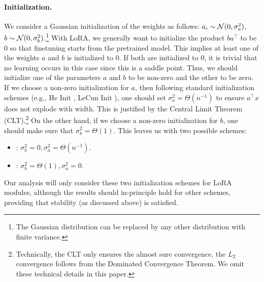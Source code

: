 \paragraph{Initialization.} We consider a Gaussian initialization of the weights as follows: $a_i \sim \mathcal{N}(0,\sigma_a^2)$, $b \sim \mathcal{N}(0, \sigma_b^2)$.\footnote{The Gaussian distribution can be replaced by any other distribution with finite variance.} With LoRA, we generally want to initialize the product $ba^\top$ to be $0$ so that finetuning starts from the pretrained model. This implies at least one of the weights $a$ and $b$ is initialized to $0$. If both are initialized to $0$, it is trivial that no learning occurs in this case since this is a saddle point. Thus, we should initialize one of the parameters $a$ and $b$ to be non-zero and the other to be zero. If we choose a non-zero initialization for $a$, then following standard initialization schemes (e.g., He Init \citep{he2016deep}, LeCun Init \citep{lecun2002efficient}), one should set $\sigma_a^2 = \Theta(n^{-1})$ to ensure $a^\top x$ does not explode with width. This is justified by the Central Limit Theorem (CLT).\footnote{Technically, the CLT only ensures the almost sure convergence, the $L_2$ convergence follows from the Dominated Convergence Theorem. We omit these technical details in this paper.} On the other hand, if we choose a non-zero initialization for $b$, one should make sure that $\sigma_b^2 = \Theta(1)$. This leaves us with two possible schemes:
\vspace{-0.2cm}
\begin{itemize}
    \item {}: $\sigma_b^2 = 0, \sigma_a^2 = \Theta(n^{-1})$.
    \item {}: $\sigma_b^2 = \Theta(1), \sigma_a^2 =0$.
\end{itemize}
\vspace{-0.2cm}
Our analysis will only consider these two initialization schemes for LoRA modules, although the results should in-principle hold for other schemes, providing that stability (as discussed above) is satisfied.

